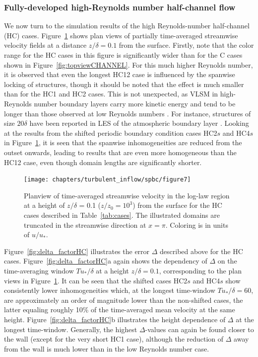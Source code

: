 		\subsubsection{Fully-developed high-Reynolds number half-channel flow}
		We now turn to the simulation results of the high Reynolds-number half-channel (HC) cases. Figure~\ref{fig:topviewHC} shows plan views of partially time-averaged streamwise velocity fields at a distance $z/\delta = 0.1$ from the surface. Firstly, note that the color range for the HC cases in this figure is significantly wider than for the C cases shown in Figure~\ref{fig:topviewCHANNEL}. For this much higher Reynolds number, it is observed that even the longest HC12 case is influenced by the spanwise locking of structures, though it should be noted that the effect is much smaller than for the HC1 and HC2 cases. This is not unexpected, as VLSM in high-Reynolds number boundary layers carry more kinetic energy and tend to be longer than those observed at low Reynolds numbers \citep{balakumar2007large,hutchins2007evidence,hutchins2007large}. For instance, structures of size $20\delta$ have been reported in LES of the atmospheric boundary layer \citep{fang2015large}.
		Looking at the results from the shifted periodic boundary condition cases HC2$s$ and HC4$s$ in Figure~\ref{fig:topviewHC}, it is seen that the spanwise inhomogeneities are reduced from the outset onwards, leading to results that are even more homogeneous than the HC12 case, even though domain lengths are significantly shorter. 
		
		\begin{figure}
						\centering
			\texttt{[image: chapters/turbulent\_inflow/spbc/figure7]}
			\caption[Planview of time-averaged streamwise velocity in the log-law region at a height of $z/\delta$ = 0.1 ($z/z_0 = 10^3$) from the surface for the HC cases.]{Planview of time-averaged streamwise velocity in the log-law region at a height of $z/\delta$ = 0.1 ($z/z_0 = 10^3$) from the surface for the HC cases described in Table~\ref{tab:cases}. The illustrated domains are truncated in the streamwise direction at $x = \pi$. Coloring is in units of  $u/u_*$.}
			\label{fig:topviewHC}
		\end{figure}
		
		Figure~\ref{fig:delta_factorHC} illustrates the error $\Delta$ described above for the HC cases. Figure~\ref{fig:delta_factorHC}a again shows the dependency of $\Delta$ on the time-averaging window $Tu_*/\delta$ at a height $z/\delta = 0.1$, corresponding to the plan views in Figure~\ref{fig:topviewHC}. It can be seen that the shifted cases HC2$s$ and HC4$s$ show consistently lower inhomogeneities which, at the longest time-window $Tu_*/\delta = 60$, are approximately an order of magnitude lower than the non-shifted cases, the latter equaling roughly 10\% of the time-averaged mean velocity at the same height. Figure~\ref{fig:delta_factorHC}b illustrates the height dependence of $\Delta$ at the longest time-window. Generally, the highest $\Delta$-values can again be found closer to the wall (except for the very short HC1 case), although the reduction of $\Delta$ away from the wall is much lower than in the low Reynolds number case. 
		
